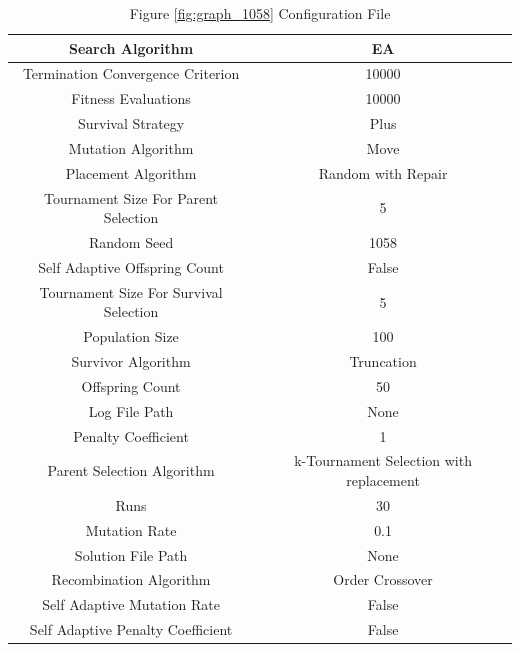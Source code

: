 \documentclass{standalone}
\begin{document}
\begin{table}[!htb]
	\centering
	\caption{Figure \ref{fig:graph_1058} Configuration File}
	\label{tab:graph_1058}
	\begin{tabular}{| c | c |}
		\hline
		Search Algorithm		& EA		 \\
		\hline
		Termination Convergence Criterion		& 10000		 \\
		\hline
		Fitness Evaluations		& 10000		 \\
		\hline
		Survival Strategy		& Plus		 \\
		\hline
		Mutation Algorithm		& Move		 \\
		\hline
		Placement Algorithm		& Random with Repair		 \\
		\hline
		Tournament Size For Parent Selection		& 5		 \\
		\hline
		Random Seed		& 1058		 \\
		\hline
		Self Adaptive Offspring Count		& False		 \\
		\hline
		Tournament Size For Survival Selection		& 5		 \\
		\hline
		Population Size		& 100		 \\
		\hline
		Survivor Algorithm		& Truncation		 \\
		\hline
		Offspring Count		& 50		 \\
		\hline
		Log File Path		& None		 \\
		\hline
		Penalty Coefficient		& 1		 \\
		\hline
		Parent Selection Algorithm		& k-Tournament Selection with replacement		 \\
		\hline
		Runs		& 30		 \\
		\hline
		Mutation Rate		& 0.1		 \\
		\hline
		Solution File Path		& None		 \\
		\hline
		Recombination Algorithm		& Order Crossover		 \\
		\hline
		Self Adaptive Mutation Rate		& False		 \\
		\hline
		Self Adaptive Penalty Coefficient		& False		 \\
		\hline
	\end{tabular}
\end{table}
\end{document}
